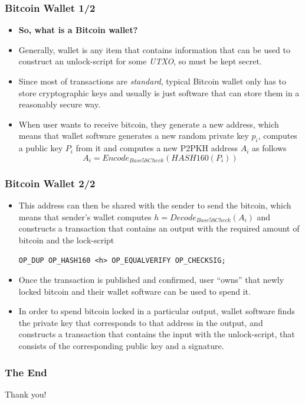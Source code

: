 \documentclass{beamer}
\begin{document}
\begin{frame}[fragile]
  \frametitle{Bitcoin Wallet 1/2}
  \begin{itemize}
  \item \textbf{So, what is a Bitcoin wallet?}
  \item Generally, wallet is any item that contains information that can be used
    to construct an unlock-script for some \textit{UTXO}, so must be kept secret.
  \item Since most of transactions are \textit{standard}, typical Bitcoin wallet
    only has to store cryptographic keys and usually is just software that can
    store them in a reasonably secure way.
  \item When user wants to receive bitcoin, they generate a new address, which
    means that wallet software generates a new random private key $p_i$, computes a
    public key $P_i$ from it and computes a new P2PKH address $A_i$ as follows
    $$A_i = Encode_{Base58Check}(HASH160(P_i))$$
  \end{itemize}
\end{frame}

\begin{frame}[fragile]
  \frametitle{Bitcoin Wallet 2/2}
  \begin{itemize}
  \item This address can then be shared with the sender to send the bitcoin,
    which means that sender's wallet computes $h = Decode_{Base58Check}(A_i)$
    and constructs a transaction that contains an output with the required
    amount of bitcoin and the lock-script
    \begin{center}
      \tiny\texttt{OP_DUP OP_HASH160 <h> OP_EQUALVERIFY OP_CHECKSIG;}
    \end{center}
  \item Once the transaction is published and confirmed, user ``owns'' that
    newly locked bitcoin and their wallet software can be used to spend it.
  \item In order to spend bitcoin locked in a particular output, wallet software
    finds the private key that corresponds to that address in the output, and
    constructs a transaction that contains the input with the unlock-script,
    that consists of the corresponding public key and a signature.
  \end{itemize}
\end{frame}

\begin{frame}
  \frametitle{The End}
  \begin{center}
    Thank you!
  \end{center}
\end{frame}
\end{document}
